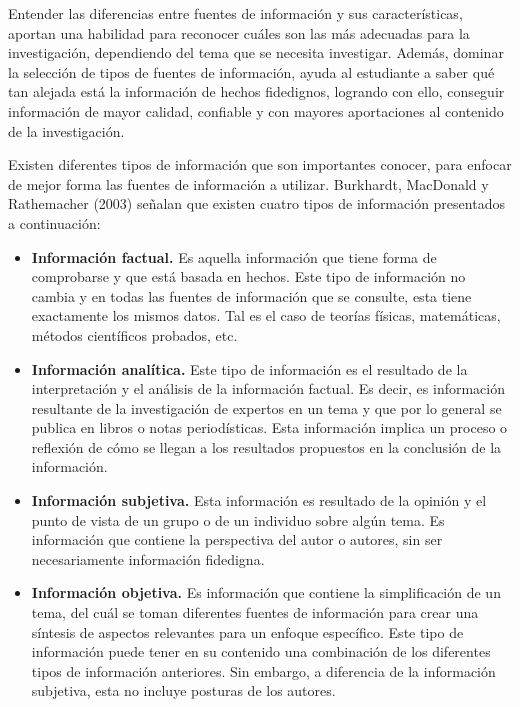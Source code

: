 Entender las diferencias entre fuentes de información y sus características, aportan una habilidad para reconocer cuáles son las más adecuadas para la investigación, dependiendo del tema que se necesita investigar. Además, dominar la selección de tipos de fuentes de información, ayuda al estudiante a saber qué tan alejada está la información de hechos fidedignos, logrando con ello, conseguir información de mayor calidad, confiable y con mayores aportaciones al contenido de la investigación.

Existen diferentes tipos de información que son importantes conocer, para enfocar de mejor forma las fuentes de información a utilizar. Burkhardt, MacDonald y Rathemacher (2003) señalan que existen cuatro tipos de información presentados a continuación:

\begin{itemize}
  \item \textbf{Información factual.} Es aquella información que tiene forma de comprobarse y que está basada en hechos. Este tipo de información no cambia y en todas las fuentes de información que se consulte, esta tiene exactamente los mismos datos. Tal es el caso de teorías físicas, matemáticas, métodos científicos probados, etc.
  \item \textbf{Información analítica.} Este tipo de información es el resultado de la interpretación y el análisis de la información factual. Es decir, es información resultante de la investigación de expertos en un tema y que por lo general se publica en libros o notas periodísticas. Esta información implica un proceso o reflexión de cómo se llegan a los resultados propuestos en la conclusión de la información.
  \item \textbf{Información subjetiva.} Esta información es resultado de la opinión y el punto de vista de un grupo o de un individuo sobre algún tema. Es información que contiene la perspectiva del autor o autores, sin ser necesariamente información fidedigna.
  \item \textbf{Información objetiva.} Es información que contiene la simplificación de un tema, del cuál se toman diferentes fuentes de información para crear una síntesis de aspectos relevantes para un enfoque específico. Este tipo de información puede tener en su contenido una combinación de los diferentes tipos de información anteriores. Sin embargo, a diferencia de la información subjetiva, esta no incluye posturas de los autores.
\end{itemize}

